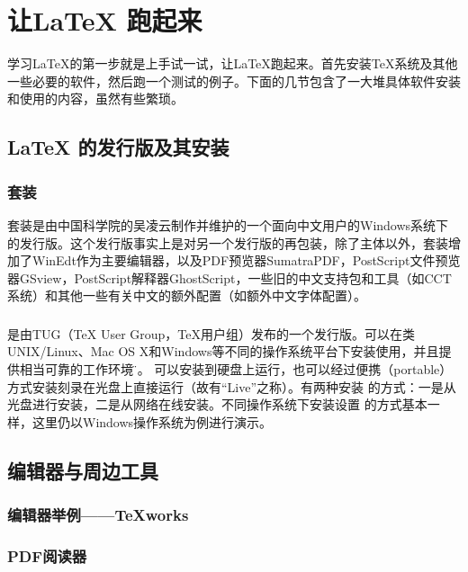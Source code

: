 \section{让\LaTeX{} 跑起来}
学习\LaTeX 的第一步就是上手试一试，让\LaTeX 跑起来。首先安装\TeX 系统及其他一些必要的软件，然后跑一个测试的例子。下面的几节包含了一大堆具体软件安装和使用的内容，虽然有些繁琐。

\subsection{\LaTeX{} 的发行版及其安装}

\subsubsection{\CTeXpkg 套装}
\noindent\makebox[0pt][r]{\dbend~\dbend\,}\hspace{2\ccwd}\CTeXpkg 套装是由中国科学院的吴凌云制作并维护的一个面向中文用户的Windows系统下的发行版。这个发行版事实上是对另一个发行版\MiKTeX 的再包装，除了\MiKTeX 主体以外，\CTeXpkg 套装增加了WinEdt作为主要编辑器，以及PDF预览器SumatraPDF，PostScript文件预览器GSview，PostScript解释器GhostScript，一些旧的中文支持包和工具（如CCT系统）和其他一些有关中文的额外配置（如额外中文字体配置）。

\subsubsection{\TeXLive}
\TeXLive{} 是由TUG（\TeX{} User Group，\TeX 用户组）发布的一个发行版。\TeXLive 可以在类UNIX/Linux、Mac OS X和Windows等不同的操作系统平台下安装使用，并且提供相当可靠的工作环境 ̈。\TeXLive{} 可以安装到硬盘上运行，也可以经过便携（portable）方式安装刻录在光盘上直接运行（故有“Live”之称）。有两种安装\TeXLive{} 的方式：一是从\TeXLive{} 光盘进行安装，二是从网络在线安装。不同操作系统下安装设置\TeXLive{} 的方式基本一样，这里仍以Windows操作系统为例进行演示。

\subsection{编辑器与周边工具}

\subsubsection{编辑器举例——TeXworks}

\subsubsection{PDF阅读器}

